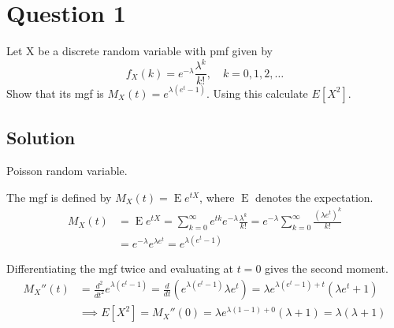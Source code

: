\section*{Question 1}

Let X be a discrete random variable with pmf given by
\begin{equation*}
    f_X(k) = e^{-\lambda} \frac{\lambda^k}{k!}, \quad k = 0, 1, 2, \ldots
\end{equation*}
Show that its mgf is \(M_X(t) = e^{\lambda(e^t - 1)}\).
Using this calculate \(E[X^2]\).

\subsection*{Solution}

Poisson random variable.

The mgf is defined by \( M_X(t) = \operatorname{E}{e^{tX}} \), where \( \operatorname{E} \) denotes the expectation.
\begin{align*}
    M_X(t)
     & =
    \operatorname{E}{e^{tX}}
    = \sum_{k=0}^{\infty} e^{tk} e^{-\lambda} \frac{\lambda^k}{k!}
    = e^{-\lambda} \sum_{k=0}^{\infty} \frac{{(\lambda e^t)}^k}{k!}
    \\ & =
    e^{-\lambda} e^{\lambda e^t}
    =
    \boxed{
        e^{\lambda(e^t - 1)}
    }
\end{align*}

Differentiating the mgf twice and evaluating at \( t = 0 \) gives the second moment.
\begin{align*}
    M_X''(t)
     & =
    \frac{d^2}{dt^2} e^{\lambda(e^t - 1)}
    =
    \frac{d}{dt} (e^{\lambda(e^t - 1)} \lambda e^t)
    =
    \lambda e^{\lambda(e^t - 1) + t} (\lambda e^t + 1)
    \\ &
    \implies
    E[X^2]
    = M_X''(0)
    = \lambda e^{\lambda(1 - 1) + 0} (\lambda + 1)
    = \boxed{\lambda(\lambda + 1)}
\end{align*}
